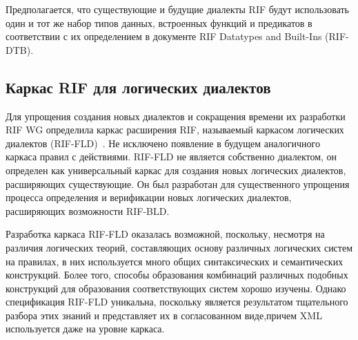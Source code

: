 \begin{multicols}{2}
Предполагается, что существующие и будущие диалекты RIF будут использовать один и тот 
же набор типов данных, встроенных функций и предикатов в соответствии с их 
определением в документе RIF Datatypes and Built-Ins (RIF-DTB).

\vspace*{-6pt}

   \subsection{Каркас RIF для логических диалектов} %

Для упрощения создания новых диалектов и сокращения времени их разработки RIF WG 
определила каркас расширения RIF, называемый каркасом логических диалектов 
(RIF-FLD)~\cite{42kal}. Не исклю\-че\-но появление в будущем аналогичного каркаса правил с 
действиями. RIF-FLD не является собственно диалектом, он определен как универсальный 
каркас для создания новых логических диалектов, расширяющих существующие. Он был 
разработан для существенного упрощения процесса определения и верификации новых 
логических диалектов, расширяющих возможности RIF-BLD.

Разработка каркаса RIF-FLD оказалась возможной, поскольку, несмотря на различия 
логических теорий, составляющих основу различных логических систем на правилах, в них 
используется много общих синтаксических и семантических конструкций. Более того, 
способы образования комбинаций различных подобных конструкций для образования 
соответствующих систем хорошо изучены. Однако спецификация RIF-FLD уникальна, 
поскольку является результатом тщательного разбора этих знаний и представляет их в 
согласованном виде,\linebreak причем XML используется даже на уровне кар\-каса.
{

}


\end{multicols}
